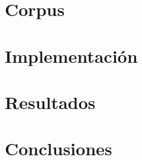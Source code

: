 \documentclass[12pt, letterpaper]{article}
\begin{document}
    \section{Corpus}
    \section{Implementación}

    \section{Resultados}
    \section{Conclusiones}

    \pagebreak
\end{document}
